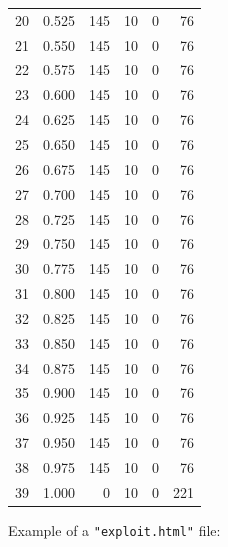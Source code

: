 \documentclass[a4paper,twoside,12pt]{book}
\begin{document}
\begin{appendices}
\begin{table}
\begin{tabular}{lrrrrr}
		20 &  0.525 &       145 &        10 &               0 &              76 \\
		21 &  0.550 &       145 &        10 &               0 &              76 \\
		22 &  0.575 &       145 &        10 &               0 &              76 \\
		23 &  0.600 &       145 &        10 &               0 &              76 \\
		24 &  0.625 &       145 &        10 &               0 &              76 \\
		25 &  0.650 &       145 &        10 &               0 &              76 \\
		26 &  0.675 &       145 &        10 &               0 &              76 \\
		27 &  0.700 &       145 &        10 &               0 &              76 \\
		28 &  0.725 &       145 &        10 &               0 &              76 \\
		29 &  0.750 &       145 &        10 &               0 &              76 \\
		30 &  0.775 &       145 &        10 &               0 &              76 \\
		31 &  0.800 &       145 &        10 &               0 &              76 \\
		32 &  0.825 &       145 &        10 &               0 &              76 \\
		33 &  0.850 &       145 &        10 &               0 &              76 \\
		34 &  0.875 &       145 &        10 &               0 &              76 \\
		35 &  0.900 &       145 &        10 &               0 &              76 \\
		36 &  0.925 &       145 &        10 &               0 &              76 \\
		37 &  0.950 &       145 &        10 &               0 &              76 \\
		38 &  0.975 &       145 &        10 &               0 &              76 \\
		39 &  1.000 &         0 &        10 &               0 &             221 \\
		\bottomrule
	\end{tabular}
\end{table} 

Example of a \lstinline|"exploit.html"| file:

\begin{lstlisting}


\end{lstlisting}
\end{appendices}
\end{document}
